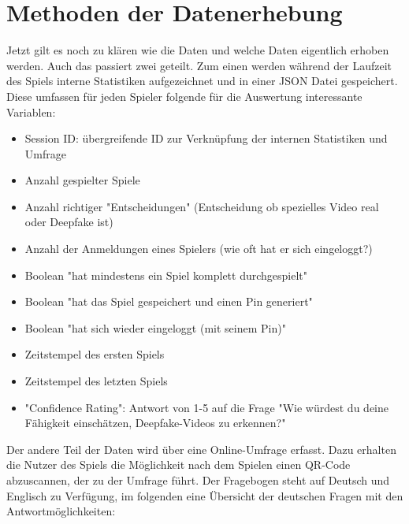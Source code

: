 \section{Methoden der Datenerhebung}
Jetzt gilt es noch zu klären wie die Daten und welche Daten eigentlich erhoben werden. 
Auch das passiert zwei geteilt. 
Zum einen werden während der Laufzeit des Spiels interne Statistiken aufgezeichnet und in einer JSON Datei gespeichert. 
Diese umfassen für jeden Spieler folgende für die Auswertung interessante Variablen:
\begin{itemize}
    \item Session ID: übergreifende ID zur Verknüpfung der internen Statistiken und Umfrage
    \item Anzahl gespielter Spiele
    \item Anzahl richtiger "Entscheidungen" (Entscheidung ob spezielles Video real oder Deepfake ist)
    \item Anzahl der Anmeldungen eines Spielers (wie oft hat er sich eingeloggt?)
    \item Boolean "hat mindestens ein Spiel komplett durchgespielt"
    \item Boolean "hat das Spiel gespeichert und einen Pin generiert"
    \item Boolean "hat sich wieder eingeloggt (mit seinem Pin)"
    \item Zeitstempel des ersten Spiels
    \item Zeitstempel des letzten Spiels
    \item "Confidence Rating": Antwort von 1-5 auf die Frage "Wie würdest du deine Fähigkeit einschätzen, Deepfake-Videos zu erkennen?"
\end{itemize}
Der andere Teil der Daten wird über eine Online-Umfrage erfasst. 
Dazu erhalten die Nutzer des Spiels die Möglichkeit nach dem Spielen einen QR-Code abzuscannen, der zu der Umfrage führt. 
Der Fragebogen steht auf Deutsch und Englisch zu Verfügung, im folgenden eine Übersicht der deutschen Fragen mit den Antwortmöglichkeiten:

